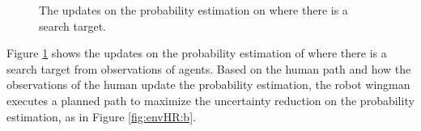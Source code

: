 \begin{figure} 
  \centering 
  \caption{The updates on the probability estimation on where there is a search target.} 
  \label{fig:envHR} %
\end{figure}

Figure \ref{fig:envHR} shows the updates on the probability estimation of where there is a search target from observations of agents.
Based on the human path and how the observations of the human update the probability estimation, the robot wingman executes a planned path to maximize the uncertainty reduction on the probability estimation, as in Figure \ref{fig:envHR:b}.

